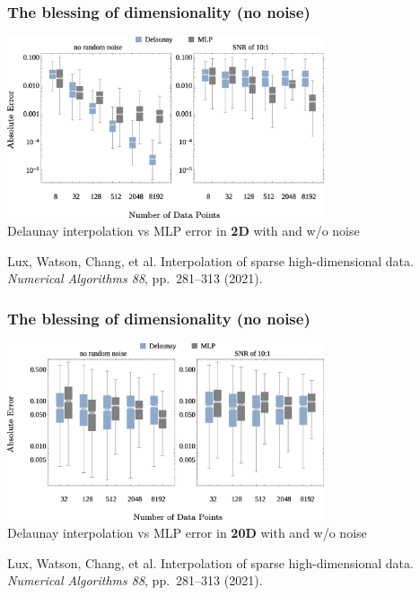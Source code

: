 \documentclass[aspectratio=169]{beamer}
\begin{document}
\begin{frame}
\frametitle{The blessing of dimensionality (no noise)}

\begin{center}
\includegraphics[width=0.7\textwidth]{../img/delaunay_new/2d_errors_w_noise.png}\\
Delaunay interpolation vs MLP error in {\bf 2D} with and w/o noise
\end{center}

\vfill

{\tiny Lux, Watson, Chang, et al.
Interpolation of sparse high-dimensional data.
{\sl Numerical Algorithms 88}, pp.~281–313 (2021).}

\end{frame}

\begin{frame}
\frametitle{The blessing of dimensionality (no noise)}

\begin{center}
\includegraphics[width=0.7\textwidth]{../img/delaunay_new/20d_errors_w_noise.png}\\
Delaunay interpolation vs MLP error in {\bf 20D} with and w/o noise
\end{center}

\vfill

{\tiny Lux, Watson, Chang, et al.
Interpolation of sparse high-dimensional data.
{\sl Numerical Algorithms 88}, pp.~281–313 (2021).}

\end{frame}
\end{document}
